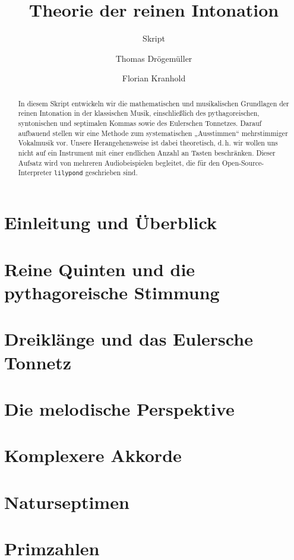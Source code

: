 \documentclass[ngerman,11pt]{scrartcl}
\title     {Theorie der reinen Intonation}
\author    {Thomas Drögemüller\and Florian Kranhold}
\subtitle  {Skript}
\begin{document}
\maketitle

\begin{abstract}
  In diesem Skript entwickeln wir die mathematischen und musikalischen
  Grundlagen der reinen Intonation in der klassischen Musik, einschließlich des
  pythagoreischen, syntonischen und septimalen Kommas sowie des Eulerschen
  Tonnetzes. Darauf aufbauend stellen wir eine Methode zum systematischen
  „Ausstimmen“ mehrstimmiger Vokalmusik vor. Unsere Herangehensweise ist dabei
  theoretisch, d.\,h. wir wollen uns nicht auf ein Instrument mit einer
  endlichen Anzahl an Tasten beschränken. Dieser Aufsatz wird von mehreren
  Audiobeispielen begleitet, die für den Open-Source-Interpreter
  \texttt{lilypond} geschrieben sind.
\end{abstract}

\section{Einleitung und Überblick}
\label{sec:int}


\section{Reine Quinten und die pythagoreische Stimmung}
\label{sec:pyth}


\section{Dreiklänge und das Eulersche Tonnetz}
\label{sec:tri}


\section{Die melodische Perspektive}
\label{sec:melody}


\section{Komplexere Akkorde}
\label{sec:quad}


\section{Naturseptimen}
\label{sec:sept}


\appendix
\section{Primzahlen}
\label{sec:primes}


\printbibliography[heading=bibintoc]
\end{document}
